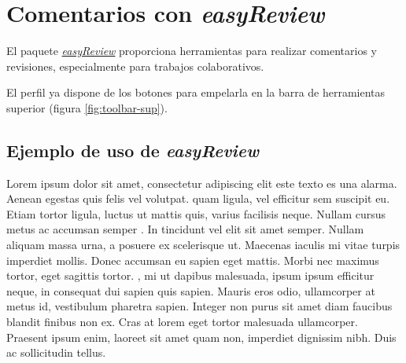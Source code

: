 \chapter{Comentarios con \textit{easyReview}}
El paquete \href{https://www.ctan.org/pkg/easyreview}{\textit{easyReview}} proporciona herramientas para realizar comentarios y revisiones, especialmente para trabajos colaborativos.

El perfil ya dispone de los botones para empelarla en la barra de herramientas superior (figura \ref{fig:toolbar-sup}).

\section{Ejemplo de uso de \textit{easyReview}}
Lorem ipsum dolor sit amet, consectetur adipiscing elit \alert{este texto es una alarma}. Aenean egestas quis felis vel volutpat.  quam ligula, vel efficitur sem suscipit eu. Etiam tortor ligula, luctus ut mattis quis, varius facilisis neque. Nullam cursus metus ac accumsan semper . In tincidunt vel elit sit amet semper. Nullam aliquam massa urna, a posuere ex scelerisque ut. Maecenas iaculis  mi vitae turpis imperdiet mollis. Donec accumsan eu sapien eget mattis. Morbi nec maximus tortor, eget sagittis tortor. , mi ut dapibus malesuada, ipsum ipsum efficitur neque, in consequat dui sapien quis sapien. Mauris eros odio, ullamcorper at metus id, vestibulum pharetra sapien. Integer non purus sit amet diam faucibus blandit finibus non ex. Cras at lorem eget tortor malesuada ullamcorper. Praesent ipsum enim, laoreet sit amet quam non, imperdiet dignissim nibh. Duis ac sollicitudin tellus.